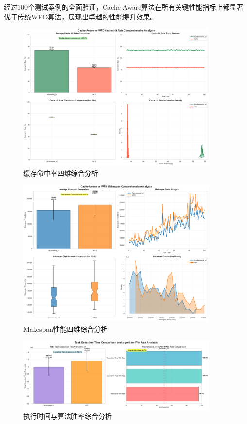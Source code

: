 经过100个测试案例的全面验证，Cache-Aware算法在所有关键性能指标上都显著优于传统WFD算法，展现出卓越的性能提升效果。

\begin{figure}[htbp]
\centering
\includegraphics[width=0.9\textwidth]{img/cache_hit_analysis.png}
\caption{缓存命中率四维综合分析}
\label{fig:cache_hit_analysis}
\end{figure}

\begin{figure}[htbp]
\centering
\includegraphics[width=0.9\textwidth]{img/makespan_analysis.png}
\caption{Makespan性能四维综合分析}
\label{fig:makespan_analysis}
\end{figure}

\begin{figure}[htbp]
\centering
\includegraphics[width=0.9\textwidth]{img/execution_time_and_win_rate_analysis.png}
\caption{执行时间与算法胜率综合分析}
\label{fig:execution_win_rate_analysis}
\end{figure}

